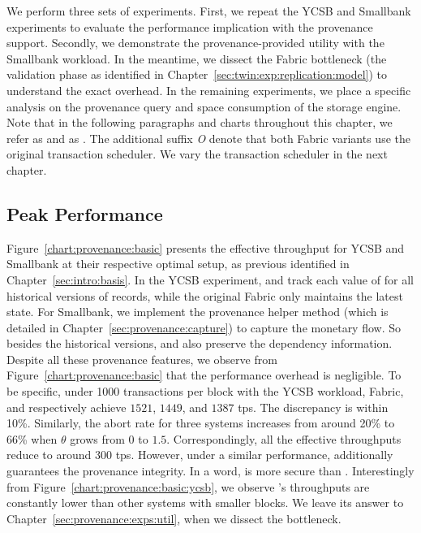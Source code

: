 We perform three sets of experiments. First, we repeat the YCSB and Smallbank experiments to evaluate the performance implication with the provenance support. 
Secondly, we demonstrate the provenance-provided utility with the Smallbank workload. In the meantime, we dissect the Fabric bottleneck (the validation phase as identified in Chapter~\ref{sec:twin:exp:replication:model}) to understand the exact overhead. 
In the remaining experiments, we place a specific analysis on the provenance query and space consumption of the storage engine. 
Note that in the following paragraphs and charts throughout this chapter, we refer {\fsPr} as {\fsPrO} and {\fs} as {\fsO}. The additional suffix \textit{O} denote that both Fabric variants use the original transaction scheduler. 
We vary the transaction scheduler in the next chapter. 

\subsection{Peak Performance}

Figure~\ref{chart:provenance:basic} presents the effective throughput for YCSB and Smallbank at their respective optimal setup, as previous identified in Chapter~\ref{sec:intro:basis}. 
In the YCSB experiment, {\fsPrO} and {\fsO} track each value of for all historical versions of records, while the original Fabric only maintains the latest state. 
For Smallbank, we implement the provenance helper method (which is detailed in Chapter~\ref{sec:provenance:capture}) to capture the monetary flow. 
So besides the historical versions, {\fsPrO} and {\fsO} also preserve the dependency information. 
Despite all these provenance features, we observe from Figure~\ref{chart:provenance:basic} that the performance overhead is negligible. 
To be specific, under 1000 transactions per block with the YCSB workload, Fabric, {\fsPrO} and {\fsO} respectively achieve $1521$, $1449$, and $1387$ tps. The discrepancy is within 10\%. 
Similarly, the abort rate for three systems increases from around 20\% to 66\% when $\theta$ grows from $0$ to $1.5$.
Correspondingly, all the effective throughputs reduce to around 300 tps. 
However, under a similar performance, {\fsO} additionally guarantees the provenance integrity. 
In a word, {\fsO} is more secure than {\fsPrO}. 
Interestingly from Figure~\ref{chart:provenance:basic:ycsb}, we observe {\fsPrO}'s throughputs are constantly lower than other systems with smaller blocks. 
We leave its answer to Chapter~\ref{sec:provenance:exps:util}, when we dissect the bottleneck. 

